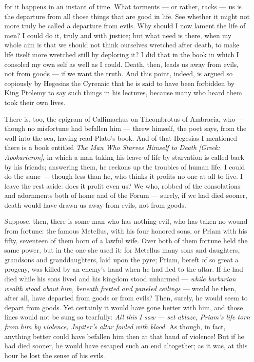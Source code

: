  for it happens in an instant of time. What torments — or rather, racks — us is the departure from all those things that are good in life. See whether it might not more truly be called a departure from evils. Why should I now lament the life of men? I could do it, truly and with justice; but what need is there, when my whole aim is that we should not think ourselves wretched after death, to make life itself more wretched still by deploring it? I did that in the book in which I consoled my own self as well as I could. Death, then, leads us away from evils, not from goods — if we want the truth. And this point, indeed, is argued so copiously by Hegesias the Cyrenaic that he is said to have been forbidden by King Ptolemy to say such things in his lectures, because many who heard them took their own lives.

 There is, too, the epigram of Callimachus on Theombrotus of Ambracia, who — though no misfortune had befallen him — threw himself, the poet says, from the wall into the sea, having read Plato's book. And of that Hegesias I mentioned there is a book entitled \textit{The Man Who Starves Himself to Death} \textit{[Greek: Apokarteron]}, in which a man taking his leave of life by starvation is called back by his friends; answering them, he reckons up the troubles of human life. I could do the same — though less than he, who thinks it profits no one at all to live. I leave the rest aside: does it profit even us? We who, robbed of the consolations and adornments both of home and of the Forum — surely, if we had died sooner, death would have drawn us away from evils, not from goods.

 Suppose, then, there is some man who has nothing evil, who has taken no wound from fortune: the famous Metellus, with his four honored sons, or Priam with his fifty, seventeen of them born of a lawful wife. Over both of them fortune held the same power, but in the one she used it: for Metellus many sons and daughters, grandsons and granddaughters, laid upon the pyre; Priam, bereft of so great a progeny, was killed by an enemy's hand when he had fled to the altar. If he had died while his sons lived and his kingdom stood unharmed — \textit{while barbarian wealth stood about him, beneath fretted and paneled ceilings} — would he then, after all, have departed from goods or from evils? Then, surely, he would seem to depart from goods. Yet certainly it would have gone better with him, and those lines would not be sung so tearfully: \textit{All this I saw — set ablaze, Priam's life torn from him by violence, Jupiter's altar fouled with blood.} As though, in fact, anything better could have befallen him then at that hand of violence! But if he had died sooner, he would have escaped such an end altogether; as it was, at this hour he lost the sense of his evils.

